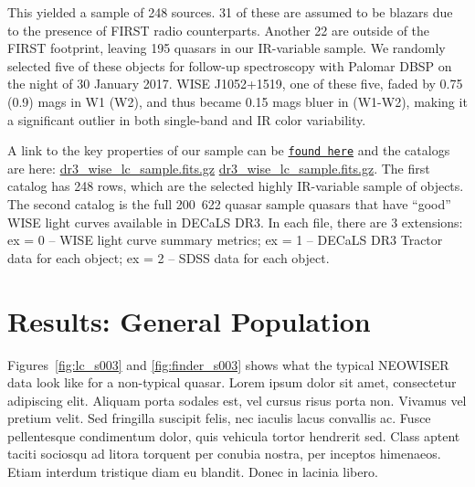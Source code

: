 \documentclass{emulateapj}
\begin{document}
This yielded a sample of 248 sources. 31 of these are assumed to be blazars 
due to the presence of FIRST radio counterparts. Another 22 are outside of the 
FIRST  footprint, leaving 195 quasars in our IR-variable sample. We randomly 
selected five of these objects for follow-up spectroscopy with Palomar DBSP on
the night of 30 January 2017. WISE J1052+1519, one of these five, 
faded by 0.75 (0.9) mags in W1 (W2), and thus became 0.15 mags bluer in 
(W1-W2), making it a significant outlier in both single-band and IR color 
variability.

A link to the key properties of our sample can be
\href{http://portal.nersc.gov/project/cosmo/temp/ameisner/qso\_pages\_v01/}
{\tt found here} and the catalogs are here:
\href{http://portal.nersc.gov/project/cosmo/temp/ameisner/dr3_wise_lc_sample.fits.gz}{dr3\_wise\_lc\_sample.fits.gz}
\href{http://portal.nersc.gov/project/cosmo/temp/ameisner/dr3_wise_lc_metrics_all_qso.fits.gz}{dr3\_wise\_lc\_sample.fits.gz}.
The first catalog has 248 rows, which are the selected highly
IR-variable sample of objects.  The second catalog is the full
\hbox{200 622} quasar sample quasars that have ``good'' WISE light
curves available in DECaLS DR3. In each file, there are 3 extensions:
ex = 0 -- WISE light curve summary metrics; ex = 1 -- DECaLS DR3
Tractor data for each object; ex = 2 -- SDSS data for each object.



\section{Results: General Population}
Figures~\ref{fig:lc_s003} and \ref{fig:finder_s003} shows what the 
typical NEOWISER data look like for a non-typical quasar.
Lorem ipsum dolor sit amet, consectetur adipiscing elit. Aliquam porta
sodales est, vel cursus risus porta non. Vivamus vel pretium
velit. Sed fringilla suscipit felis, nec iaculis lacus convallis
ac. Fusce pellentesque condimentum dolor, quis vehicula tortor
hendrerit sed. Class aptent taciti sociosqu ad litora torquent per
conubia nostra, per inceptos himenaeos. Etiam interdum tristique diam
eu blandit. Donec in lacinia libero.
\end{document}
